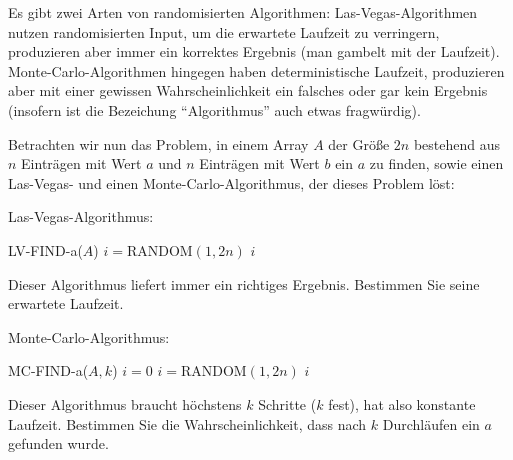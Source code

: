 
\begin{exercise}

Es gibt zwei Arten von randomisierten Algorithmen:
Las-Vegas-Algorithmen nutzen randomisierten Input, um die erwartete Laufzeit zu verringern, produzieren aber immer ein korrektes Ergebnis (man gambelt mit der Laufzeit).
Monte-Carlo-Algorithmen hingegen haben deterministische Laufzeit, produzieren aber mit einer gewissen Wahrscheinlichkeit ein falsches oder gar kein Ergebnis (insofern ist die Bezeichung \enquote{Algorithmus} auch etwas fragwürdig).

Betrachten wir nun das Problem, in einem Array $A$ der Größe $2 n$ bestehend aus $n$ Einträgen mit Wert $a$ und $n$ Einträgen mit Wert $b$ ein $a$ zu finden, sowie einen Las-Vegas- und einen Monte-Carlo-Algorithmus, der dieses Problem löst:

\phantom{}

Las-Vegas-Algorithmus:

\begin{algorithmic}
    \State LV-FIND-a($A$)
        \State $i = \text{RANDOM}(1, 2 n)$
            \State \Return $i$
        \EndIf
    \EndWhile
\end{algorithmic}

\phantom{}

Dieser Algorithmus liefert immer ein richtiges Ergebnis.
Bestimmen Sie seine erwartete Laufzeit.

\phantom{}

Monte-Carlo-Algorithmus:

\begin{algorithmic}
    \State MC-FIND-a($A, k$)
    \State $i = 0$
        \State $i = \text{RANDOM}(1, 2 n)$
            \State \Return $i$
        \EndIf
    \EndWhile
\end{algorithmic}

\phantom{}

Dieser Algorithmus braucht höchstens $k$ Schritte ($k$ fest), hat also konstante Laufzeit.
Bestimmen Sie die Wahrscheinlichkeit, dass nach $k$ Durchläufen ein $a$ gefunden wurde.

\end{exercise}

